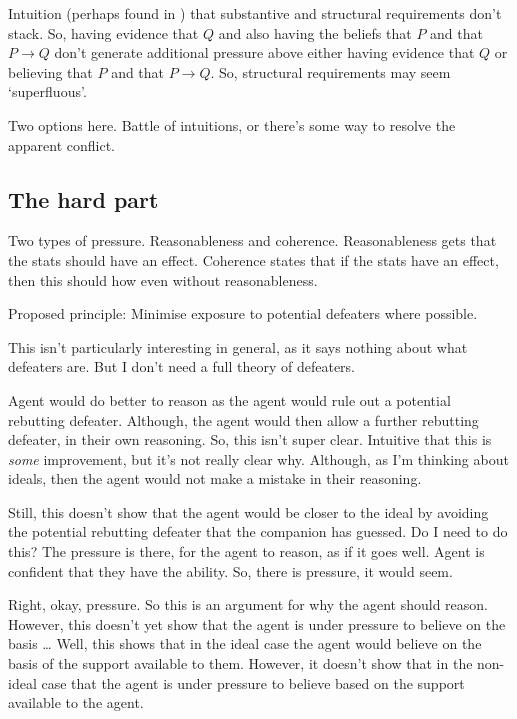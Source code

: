 \documentclass[10pt]{article}
\begin{document}
Intuition (perhaps found in \citeauthor{Kolodny:2007aa}) that substantive and structural requirements don't stack.
So, having evidence that \(Q\) and also having the beliefs that \(P\) and that \(P \rightarrow Q\) don't generate additional pressure above either having evidence that \(Q\) or believing that \(P\) and that \(P \rightarrow Q\).
So, structural requirements may seem `superfluous'.

Two options here.
Battle of intuitions, or there's some way to resolve the apparent conflict.


\subsection{The hard part}
\label{sec:hard-part}









Two types of pressure.
Reasonableness and coherence.
Reasonableness gets that the stats should have an effect.
Coherence states that if the stats have an effect, then this should how even without reasonableness.










Proposed principle: Minimise exposure to potential defeaters where possible.

This isn't particularly interesting in general, as it says nothing about what defeaters are.
But I don't need a full theory of defeaters.

Agent would do better to reason as the agent would rule out a potential rebutting defeater.
Although, the agent would then allow a further rebutting defeater, in their own reasoning.
So, this isn't super clear.
Intuitive that this is \emph{some} improvement, but it's not really clear why.
Although, as I'm thinking about ideals, then the agent would not make a mistake in their reasoning.

Still, this doesn't show that the agent would be closer to the ideal by avoiding the potential rebutting defeater that the companion has guessed.
Do I need to do this?
The pressure is there, for the agent to reason, as if it goes well.
Agent is confident that they have the ability.
So, there is pressure, it would seem.

Right, okay, pressure.
So this is an argument for why the agent should reason.
However, this doesn't yet show that the agent is under pressure to believe on the basis \dots
Well, this shows that in the ideal case the agent would believe on the basis of the support available to them.
However, it doesn't show that in the non-ideal case that the agent is under pressure to believe based on the support available to the agent.
\end{document}
